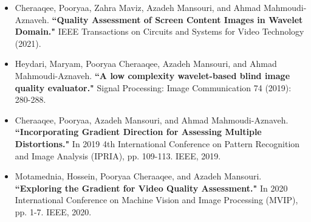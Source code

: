 \documentclass[10pt,a4paper]{altacv}
\begin{document}
\begin{itemize}
		\item Cheraaqee, Pooryaa, Zahra Maviz, Azadeh Mansouri, and Ahmad Mahmoudi-Aznaveh. \textbf{``Quality Assessment of Screen Content Images in Wavelet Domain."} IEEE Transactions on Circuits and Systems for Video Technology (2021).

		\item Heydari, Maryam, Pooryaa Cheraaqee, Azadeh Mansouri, and Ahmad Mahmoudi-Aznaveh. \textbf{``A low complexity wavelet-based blind image quality evaluator."} Signal Processing: Image Communication 74 (2019): 280-288.

		\item Cheraaqee, Pooryaa, Azadeh Mansouri, and Ahmad Mahmoudi-Aznaveh. \textbf{``Incorporating Gradient Direction for Assessing Multiple Distortions."} In 2019 4th International Conference on Pattern Recognition and Image Analysis (IPRIA), pp. 109-113. IEEE, 2019.

		\item Motamednia, Hossein, Pooryaa Cheraaqee, and Azadeh Mansouri. \textbf{``Exploring the Gradient for Video Quality Assessment."} In 2020 International Conference on Machine Vision and Image Processing (MVIP), pp. 1-7. IEEE, 2020.

  
  \end{itemize}



\clearpage
\end{document}
